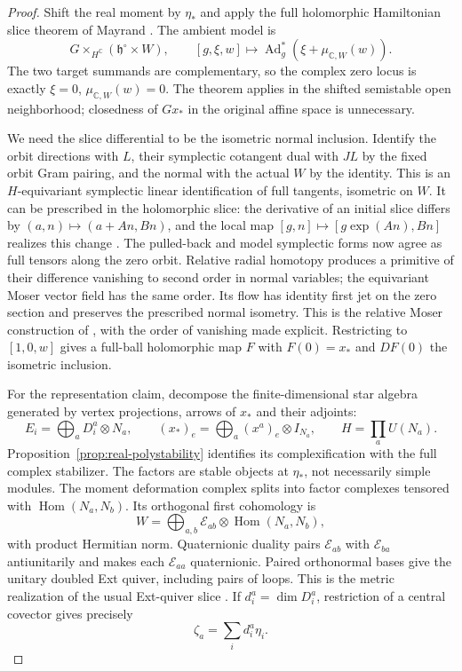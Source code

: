 \begin{proof}
Shift the real moment by $\eta_*$ and apply the full holomorphic
Hamiltonian slice theorem of Mayrand
\cite[Theorem~1.3, Proposition~3.1 and (3.5)]{May22}.
The ambient model is
\[
 G\times_{H^{\mathbb C}}(\mathfrak h^\circ\times W),
 \qquad
 [g,\xi,w]\longmapsto
 \operatorname{Ad}_g^*(\xi+\mu_{\mathbb C,W}(w)).
\]
The two target summands are complementary, so the complex zero
locus is exactly $\xi=0$, $\mu_{\mathbb C,W}(w)=0$.
The theorem applies in the shifted semistable open neighborhood;
closedness of $Gx_*$ in the original affine space is unnecessary.

We need the slice differential to be the isometric normal inclusion.
Identify the orbit directions with $L$, their symplectic cotangent dual
with $JL$ by the fixed orbit Gram pairing, and the normal with the
actual $W$ by the identity. This is an $H$-equivariant symplectic
linear identification of full tangents, isometric on $W$.
It can be prescribed in the holomorphic slice: the derivative of an
initial slice differs by $(a,n)\mapsto(a+An,Bn)$, and the local
map $[g,n]\mapsto[g\exp(An),Bn]$ realizes this change
\cite[Theorem~3.9 and \S3.5]{May22}.
The pulled-back and model symplectic forms now agree as full tensors
along the zero orbit. Relative radial homotopy produces a primitive
of their difference vanishing to second order in normal variables;
the equivariant Moser vector field has the same order. Its flow has
identity first jet on the zero section and preserves the prescribed
normal isometry. This is the relative Moser construction of
\cite[Theorem~3.3 and Remark~3.4]{May22}, with the order of vanishing
made explicit. Restricting to $[1,0,w]$ gives a full-ball holomorphic
map $F$ with $F(0)=x_*$ and $DF(0)$ the isometric inclusion.

For the representation claim, decompose the finite-dimensional star
algebra generated by vertex projections, arrows of $x_*$ and their
adjoints:
\[
 E_i=\bigoplus_a D_i^a\otimes N_a,\qquad
 (x_*)_e=\bigoplus_a(x^a)_e\otimes I_{N_a},\qquad
 H=\prod_aU(N_a).
\]
Proposition~\ref{prop:real-polystability} identifies its complexification
with the full complex stabilizer. The factors are stable objects at
$\eta_*$, not necessarily simple modules.
The moment deformation complex splits into factor complexes tensored
with $\operatorname{Hom}(N_a,N_b)$. Its orthogonal first cohomology is
\[
 W=\bigoplus_{a,b}\mathcal E_{ab}\otimes\operatorname{Hom}(N_a,N_b),
\]
with product Hermitian norm. Quaternionic duality pairs
$\mathcal E_{ab}$ with $\mathcal E_{ba}$ antiunitarily and makes each
$\mathcal E_{aa}$ quaternionic. Paired orthonormal bases give the
unitary doubled Ext quiver, including pairs of loops. This is the
metric realization of the usual Ext-quiver slice
\cite[\S3.2]{BeSc24}. If $d_i^a=\dim D_i^a$, restriction of a central
covector gives precisely
\begin{equation}\label{eq:normal-level}
 \zeta_a=\sum_i d_i^a\eta_i.
\end{equation}


\end{proof}
